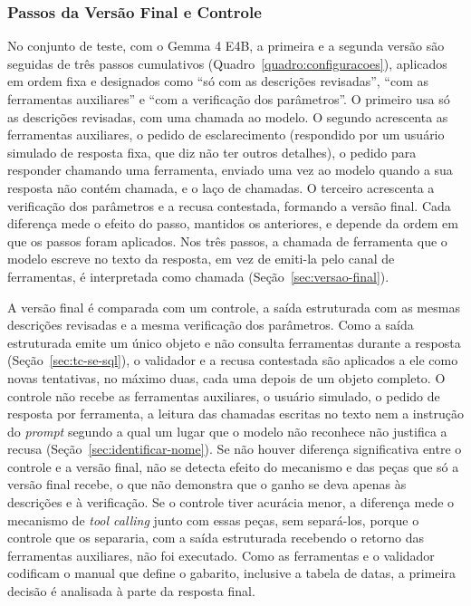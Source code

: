 \subsubsection{Passos da Versão Final e Controle}
\label{sec:metodo-controle}

No conjunto de teste, com o Gemma 4 E4B, a primeira e a segunda versão são seguidas de três passos cumulativos (Quadro~\ref{quadro:configuracoes}), aplicados em ordem fixa e designados como ``só com as descrições revisadas'', ``com as ferramentas auxiliares'' e ``com a verificação dos parâmetros''. O primeiro usa só as descrições revisadas, com uma chamada ao modelo. O segundo acrescenta as ferramentas auxiliares, o pedido de esclarecimento (respondido por um usuário simulado de resposta fixa, que diz não ter outros detalhes), o pedido para responder chamando uma ferramenta, enviado uma vez ao modelo quando a sua resposta não contém chamada, e o laço de chamadas. O terceiro acrescenta a verificação dos parâmetros e a recusa contestada, formando a versão final. Cada diferença mede o efeito do passo, mantidos os anteriores, e depende da ordem em que os passos foram aplicados. Nos três passos, a chamada de ferramenta que o modelo escreve no texto da resposta, em vez de emiti-la pelo canal de ferramentas, é interpretada como chamada (Seção~\ref{sec:versao-final}).

A versão final é comparada com um controle, a saída estruturada com as mesmas descrições revisadas e a mesma verificação dos parâmetros. Como a saída estruturada emite um único objeto e não consulta ferramentas durante a resposta (Seção~\ref{sec:tc-se-sql}), o validador e a recusa contestada são aplicados a ele como novas tentativas, no máximo duas, cada uma depois de um objeto completo. O controle não recebe as ferramentas auxiliares, o usuário simulado, o pedido de resposta por ferramenta, a leitura das chamadas escritas no texto nem a instrução do \textit{prompt} segundo a qual um lugar que o modelo não reconhece não justifica a recusa (Seção~\ref{sec:identificar-nome}). Se não houver diferença significativa entre o controle e a versão final, não se detecta efeito do mecanismo e das peças que só a versão final recebe, o que não demonstra que o ganho se deva apenas às descrições e à verificação. Se o controle tiver acurácia menor, a diferença mede o mecanismo de \textit{tool calling} junto com essas peças, sem separá-los, porque o controle que os separaria, com a saída estruturada recebendo o retorno das ferramentas auxiliares, não foi executado. Como as ferramentas e o validador codificam o manual que define o gabarito, inclusive a tabela de datas, a primeira decisão é analisada à parte da resposta final.


